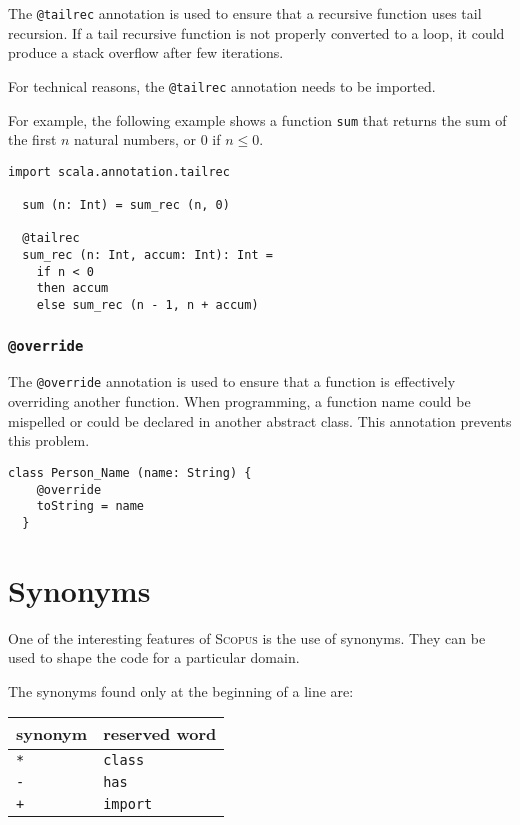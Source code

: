 \documentclass[12pt,a4paper]{article}
\makeatletter
\newcommand{\srccode}[1]{\texttt{{#1}}}
\newcommand{\reservedWord}[1]{{\color{blue}\srccode{#1}}\xspace}
\newcommand{\annotation}[1]{{\color{brown}\srccode{#1}}\xspace}
\newcommand{\sclass}{\reservedWord{class}}
\newcommand{\shas}{\reservedWord{has}}
\newcommand{\simport}{\reservedWord{import}}
\newcommand{\stailrec}{\annotation{@tailrec}}
\newcommand{\soverride}{\annotation{@override}}
\newcommand{\sasterisk}{\srccode{*}}
\newcommand{\splus}{\srccode{+}}
\newcommand{\sminus}{\srccode{-}}
\newcommand{\Scopus}{\textsc{Scopus}\xspace}
\makeatother
\begin{document}
    The \stailrec annotation is used to ensure that a recursive function uses tail recursion.
    If a tail recursive function is not properly converted to a loop, it could produce a stack overflow after few iterations.

    For technical reasons, the \stailrec annotation needs to be imported.

    For example, the following example shows a function \srccode{sum} that returns the sum of the first $n$ natural numbers, or 0 if $n \leq 0$.

    \begin{lstlisting}[label={lst:exampleTailrec}]
  import scala.annotation.tailrec

  sum (n: Int) = sum_rec (n, 0)

  @tailrec
  sum_rec (n: Int, accum: Int): Int =
    if n < 0
    then accum
    else sum_rec (n - 1, n + accum)

    \end{lstlisting}

    \subsubsection{\soverride}

    The \soverride annotation is used to ensure that a function is effectively overriding another function.
    When programming, a function name could be mispelled or could be declared in another abstract class.
    This annotation prevents this problem.

    \begin{lstlisting}[label={lst:exampleOverride}]
  class Person_Name (name: String) {
    @override
    toString = name
  }
    \end{lstlisting}


    \section{Synonyms}

    One of the interesting features of \Scopus is the use of synonyms.
    They can be used to shape the code for a particular domain.

    The synonyms found only at the beginning of a line are:

    \begin{center}
        \begin{tabular}{|ll|}
            \hline
            \textbf{synonym} & \textbf{reserved word} \\
            \hline
            \sasterisk       & \sclass                \\
            \hline
            \sminus          & \shas                  \\
            \hline
            \splus           & \simport               \\
            \hline
        \end{tabular}
    \end{center}
\end{document}
